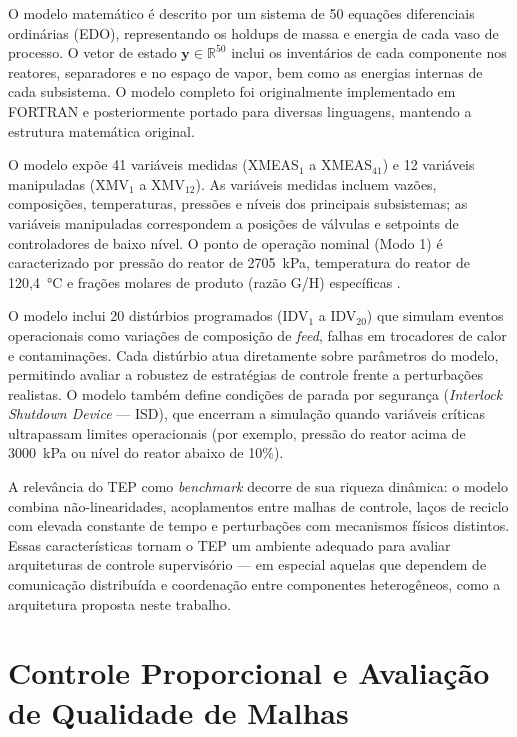 O modelo matemático é descrito por um sistema de 50 equações diferenciais ordinárias (EDO), representando os holdups de massa e energia de cada vaso de processo. O vetor de estado $\mathbf{y} \in \mathbb{R}^{50}$ inclui os inventários de cada componente nos reatores, separadores e no espaço de vapor, bem como as energias internas de cada subsistema. O modelo completo foi originalmente implementado em FORTRAN e posteriormente portado para diversas linguagens, mantendo a estrutura matemática original.

O modelo expõe 41 variáveis medidas (XMEAS$_1$ a XMEAS$_{41}$) e 12 variáveis manipuladas (XMV$_1$ a XMV$_{12}$). As variáveis medidas incluem vazões, composições, temperaturas, pressões e níveis dos principais subsistemas; as variáveis manipuladas correspondem a posições de válvulas e setpoints de controladores de baixo nível. O ponto de operação nominal (Modo 1) é caracterizado por pressão do reator de 2705~kPa, temperatura do reator de 120,4~°C e frações molares de produto (razão G/H) específicas \cite{DOWNS1993}.

O modelo inclui 20 distúrbios programados (IDV$_1$ a IDV$_{20}$) que simulam eventos operacionais como variações de composição de \textit{feed}, falhas em trocadores de calor e contaminações. Cada distúrbio atua diretamente sobre parâmetros do modelo, permitindo avaliar a robustez de estratégias de controle frente a perturbações realistas. O modelo também define condições de parada por segurança (\textit{Interlock Shutdown Device} — ISD), que encerram a simulação quando variáveis críticas ultrapassam limites operacionais (por exemplo, pressão do reator acima de 3000~kPa ou nível do reator abaixo de 10\%).

A relevância do TEP como \textit{benchmark} decorre de sua riqueza dinâmica: o modelo combina não-linearidades, acoplamentos entre malhas de controle, laços de reciclo com elevada constante de tempo e perturbações com mecanismos físicos distintos. Essas características tornam o TEP um ambiente adequado para avaliar arquiteturas de controle supervisório — em especial aquelas que dependem de comunicação distribuída e coordenação entre componentes heterogêneos, como a arquitetura proposta neste trabalho.

\section{Controle Proporcional e Avaliação de Qualidade de Malhas}
\label{sec:controle}

